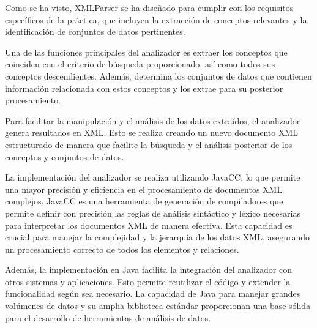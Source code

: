 

Como se ha visto, XMLParser se ha diseñado para cumplir con los requisitos específicos de la práctica, que incluyen la extracción de conceptos relevantes y la identificación de conjuntos de datos pertinentes.

Una de las funciones principales del analizador es extraer los conceptos que coinciden con el criterio de búsqueda proporcionado, así como todos sus conceptos descendientes. Además, determina los conjuntos de datos que contienen información relacionada con estos conceptos y los extrae para su posterior procesamiento.

Para facilitar la manipulación y el análisis de los datos extraídos, el analizador genera resultados en XML. Esto se realiza creando un nuevo documento XML estructurado de manera que facilite la búsqueda y el análisis posterior de los conceptos y conjuntos de datos.

La implementación del analizador se realiza utilizando JavaCC, lo que permite una mayor precisión y eficiencia en el procesamiento de documentos XML complejos. JavaCC es una herramienta de generación de compiladores que permite definir con precisión las reglas de análisis sintáctico y léxico necesarias para interpretar los documentos XML de manera efectiva. Esta capacidad es crucial para manejar la complejidad y la jerarquía de los datos XML, asegurando un procesamiento correcto de todos los elementos y relaciones.

Además, la implementación en Java facilita la integración del analizador con otros sistemas y aplicaciones. Esto permite reutilizar el código y extender la funcionalidad según sea necesario. La capacidad de Java para manejar grandes volúmenes de datos y su amplia biblioteca estándar proporcionan una base sólida para el desarrollo de herramientas de análisis de datos.

